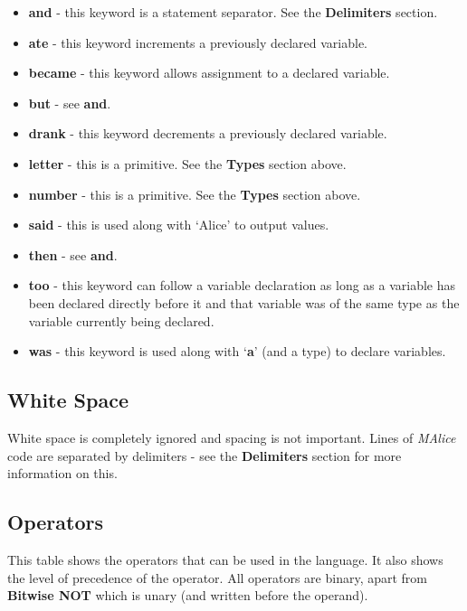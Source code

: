 \documentclass[a4, 11pt]{article}
\begin{document}
\begin{itemize}
  \item \textbf{and} - this keyword is a statement separator. See the \textbf{Delimiters} section.
  \item \textbf{ate} - this keyword increments a previously declared variable.
  \item \textbf{became} - this keyword allows assignment to a declared variable.
  \item \textbf{but} - see \textbf{and}.
  \item \textbf{drank} - this keyword decrements a previously declared variable.
  \item \textbf{letter} - this is a primitive. See the \textbf{Types} section above.
  \item \textbf{number} - this is a primitive. See the \textbf{Types} section above.
  \item \textbf{said} - this is used along with \textquoteleft Alice\textquoteright{} to output values.
  \item \textbf{then} - see \textbf{and}.
  \item \textbf{too} - this keyword can follow a variable declaration as long as a variable has been declared directly before it and that variable was of the same type as the variable currently being declared.
  \item \textbf{was} - this keyword is used along with \textquoteleft \textbf{a}\textquoteright{} (and a type) to declare variables.
\end{itemize}

\subsection*{White Space}
White space is completely ignored and spacing is not important. Lines of \emph{MAlice} code are separated by delimiters - see the \textbf{Delimiters} section for more information on this.

\subsection*{Operators}
This table shows the operators that can be used in the language. It also shows the level of precedence of the operator. All operators are binary, apart from \textbf{Bitwise NOT} which is unary (and written before the operand).
\end{document}
